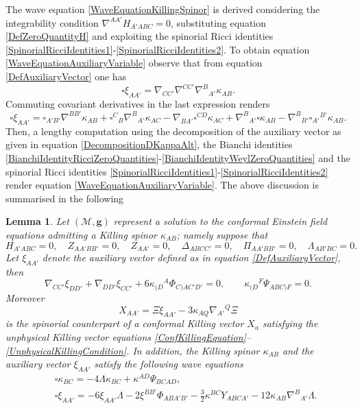 \documentclass[10pt,a4paper]{article}
\theoremstyle{plain}
\newtheorem{lemma}{Lemma}
\def\bmg{{\bm g}}
\begin{document}
The wave equation \eqref{WaveEquationKillingSpinor} is derived
considering the integrability condition $\nabla^{AA'}H_{A'ABC}=0$,
substituting equation \eqref{DefZeroQuantityH} and exploiting the
spinorial Ricci identities
\eqref{SpinorialRicciIdentities1}-\eqref{SpinorialRicciIdentities2}.
To obtain equation \eqref{WaveEquationAuxiliaryVariable} observe that
from equation \eqref{DefAuxiliaryVector} one has
\begin{equation}
\square
\xi_{AA'}=\nabla_{CC'}\nabla^{CC'}\nabla^{B}{}_{A'}\kappa_{AB}.
\end{equation}
Commuting covariant derivatives in the last expression renders
\[
\square \xi_{AA'}= \square_{A'B'}\nabla^{BB'}\kappa_{AB} +
\square^{C}{}_{B}\nabla^{B}{}_{A'}\kappa_{AC}-\nabla_{BA'}\square^{CD}\kappa_{AC}
+
\nabla^{B}{}_{A'}\square\kappa_{AB}-\nabla^{B}{}_{B'}\square_{A'}{}^{B'}\kappa_{AB}.
\]
Then, a lengthy computation using the decomposition of the auxiliary
vector as given in equation \eqref{DecompositionDKappaAlt}, the
Bianchi identities
\eqref{BianchiIdentityRicciZeroQuantities}-\eqref{BianchiIdentityWeylZeroQuantities}
and the spinorial Ricci identities
\eqref{SpinorialRicciIdentities1}-\eqref{SpinorialRicciIdentities2}
render equation \eqref{WaveEquationAuxiliaryVariable}.  The above
discussion is summarised in the following

\begin{lemma}\label{LemmaRelationKillingSpinorConformalKillingVector}
Let $(\mathcal{M},\bmg)$ represent a solution to the conformal
Einstein field equations admitting a Killing spinor $\kappa_{AB}$;
namely suppose that
\[
H_{A'ABC}=0, \quad Z_{AA'BB'}=0, \quad Z_{AA'}=0,\quad
\Delta_{ABCC'}=0, \quad \Pi_{AA'BB'}=0, \quad \Lambda_{AB'BC}=0.
\]
Let $\xi_{AA'}$ denote the auxiliary vector defined as in equation
\eqref{DefAuxiliaryVector}, then
\[
 \nabla_{CC'}\xi_{DD'} + \nabla_{DD'}\xi_{CC'}
 +6\kappa_{(D}{}^{A}\Phi_{C)AC'D'} =0, \qquad
 \kappa_{(D}{}^{F}\Psi_{ABC)F}=0.
\]
Moreover
\[
X_{AA'} =\Xi\xi_{AA'}-3\kappa_{AQ}\nabla_{A'}{}^{Q}\Xi
\]
is the spinorial counterpart of a conformal Killing vector $X_{a}$
satisfying the unphysical Killing vector equations
\eqref{ConfKillingEquation}--\eqref{UnphysicalKillingCondition}. In
addition, the Killing spinor $\kappa_{AB}$ and the auxiliary vector
$\xi_{AA'}$ satisfy the following wave equations
\begin{eqnarray} 
&& \square \kappa_{BC}=-4\Lambda\kappa_{BC} +
  \kappa^{AD}\Psi_{BCAD}, \label{WaveEqKillingSpinor} \\ && \square
  \xi_{AA'}= - 6 \xi_{AA'} \Lambda - 2 \xi^{BB'} \Phi_{ABA'B'} -
  \tfrac{3}{2} \kappa^{BC} Y_{ABCA'} - 12 \kappa_{AB}
  \nabla^{B}{}_{A'}\Lambda. \label{WaveEqAuxiliaryVector}
\end{eqnarray}
\end{lemma}
\end{document}
